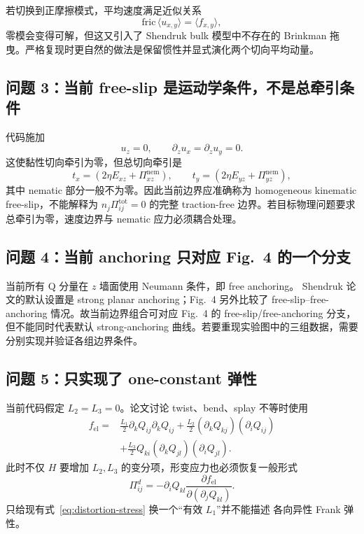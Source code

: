 \documentclass[UTF8,11pt,a4paper]{ctexart}
\begin{document}
若切换到正摩擦模式，平均速度满足近似关系
\begin{equation}
  \mathrm{fric}\,\langle u_{x,y}\rangle
  =\langle f_{x,y}\rangle,
\end{equation}
零模会变得可解，但这又引入了 Shendruk bulk 模型中不存在的 Brinkman
拖曳。严格复现时更自然的做法是保留惯性并显式演化两个切向平均动量。

\subsection{问题 3：当前 free-slip 是运动学条件，不是总牵引条件}

代码施加
\begin{equation}
  u_z=0,
  \qquad
  \partial_z u_x=\partial_z u_y=0.
\end{equation}
这使黏性切向牵引为零，但总切向牵引是
\begin{equation}
  t_x=(2\eta E_{xz}+\Pi^{\mathrm{nem}}_{xz}),
  \qquad
  t_y=(2\eta E_{yz}+\Pi^{\mathrm{nem}}_{yz}),
\end{equation}
其中 nematic 部分一般不为零。因此当前边界应准确称为 homogeneous
kinematic free-slip，不能解释为 $n_j\Pi^{\mathrm{tot}}_{ij}=0$ 的完整
traction-free 边界。若目标物理问题要求总牵引为零，速度边界与 nematic
应力必须耦合处理。

\subsection{问题 4：当前 anchoring 只对应 Fig.~4 的一个分支}

当前所有 Q 分量在 $z$ 墙面使用 Neumann 条件，即 free anchoring。
Shendruk 论文的默认设置是 strong planar anchoring；Fig.~4 另外比较了
free-slip--free-anchoring 情况。故当前边界组合可对应 Fig.~4 的
free-slip/free-anchoring 分支，但不能同时代表默认 strong-anchoring
曲线。若要重现实验图中的三组数据，需要分别实现并验证各组边界条件。

\subsection{问题 5：只实现了 one-constant 弹性}

当前代码假定 $L_2=L_3=0$。论文讨论 twist、bend、splay 不等时使用
\begin{equation}
\begin{aligned}
f_{\mathrm{el}}={}&
\frac{L_1}{2}\partial_kQ_{ij}\partial_kQ_{ij}
+\frac{L_2}{2}(\partial_kQ_{kj})(\partial_iQ_{ij})\\
&+\frac{L_3}{2}Q_{ki}(\partial_kQ_{jl})(\partial_iQ_{jl}).
\end{aligned}
\end{equation}
此时不仅 $H$ 要增加 $L_2,L_3$ 的变分项，形变应力也必须恢复一般形式
\begin{equation}
  \Pi^d_{ij}
  =-\partial_iQ_{kl}
  \frac{\partial f_{\mathrm{el}}}
       {\partial(\partial_jQ_{kl})}.
\end{equation}
只给现有式~\eqref{eq:distortion-stress} 换一个“有效 $L_1$”并不能描述
各向异性 Frank 弹性。
\end{document}
